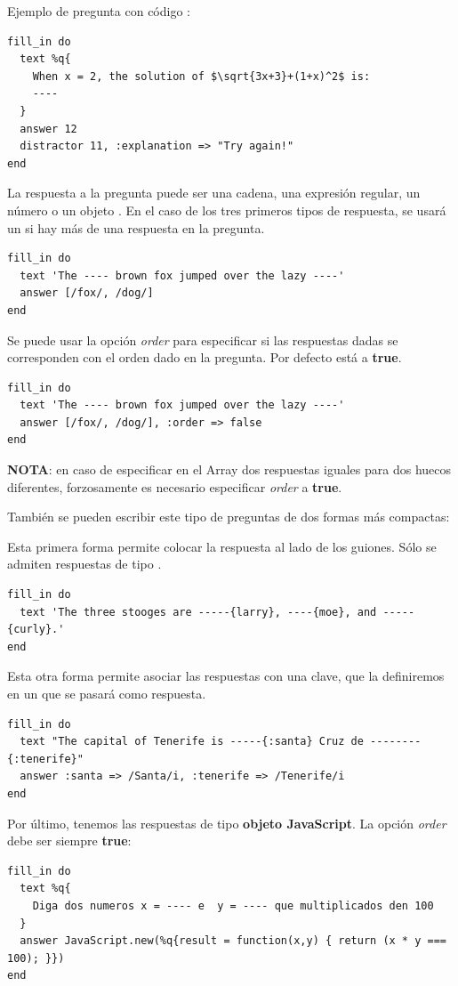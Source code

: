 Ejemplo de pregunta con c\'odigo :
\begin{lstlisting}
fill_in do
  text %q{
    When x = 2, the solution of $\sqrt{3x+3}+(1+x)^2$ is:
    ----
  }
  answer 12
  distractor 11, :explanation => "Try again!"
end
\end{lstlisting}
\bigskip

La respuesta a la pregunta puede ser una cadena, una expresi\'on regular, un n\'umero o un objeto . En el caso de los tres primeros tipos de respuesta, se usar\'a
un  si hay m\'as de una respuesta en la pregunta.
\begin{lstlisting}
fill_in do
  text 'The ---- brown fox jumped over the lazy ----'
  answer [/fox/, /dog/]
end
\end{lstlisting}
\bigskip

Se puede usar la opci\'on \textit{order} para especificar si las respuestas dadas se corresponden con el orden dado en la pregunta. Por defecto est\'a a {\bfseries true}.
\begin{lstlisting}
fill_in do
  text 'The ---- brown fox jumped over the lazy ----'
  answer [/fox/, /dog/], :order => false
end
\end{lstlisting}

{\bfseries NOTA}: en caso de especificar en el Array dos respuestas iguales para dos huecos diferentes, forzosamente es necesario especificar \textit{order} a {\bfseries true}.
\bigskip

Tambi\'en se pueden escribir este tipo de preguntas de dos formas m\'as compactas:

Esta primera forma permite colocar la respuesta al lado de los guiones. S\'olo se admiten respuestas de tipo .
\begin{lstlisting}
fill_in do
  text 'The three stooges are -----{larry}, ----{moe}, and -----{curly}.'
end
\end{lstlisting}
\bigskip

Esta otra forma permite asociar las respuestas con una clave, que la definiremos en un  que se pasar\'a como respuesta.
\begin{lstlisting}
fill_in do
  text "The capital of Tenerife is -----{:santa} Cruz de --------{:tenerife}"
  answer :santa => /Santa/i, :tenerife => /Tenerife/i
end
\end{lstlisting}
\bigskip

Por \'ultimo, tenemos las respuestas de tipo {\bfseries objeto JavaScript}. La opci\'on \textit{order} debe ser siempre {\bfseries true}:
\begin{lstlisting}
fill_in do
  text %q{
    Diga dos numeros x = ---- e  y = ---- que multiplicados den 100
  }
  answer JavaScript.new(%q{result = function(x,y) { return (x * y === 100); }})
end
\end{lstlisting}

